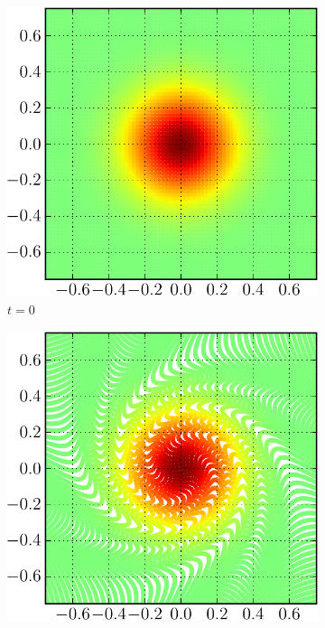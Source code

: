 \begin{figure}[t]
        \centering
        \begin{subfigure}[b]{0.45\textwidth}
                \includegraphics[width=\textwidth]{figures/lagrangian/distortion_a-crop.pdf}
                \caption{$t = 0$}
                \label{fig:distortion_a}
        \end{subfigure}%
        \qquad %
        \begin{subfigure}[b]{0.45\textwidth}
                \includegraphics[width=\textwidth]{figures/lagrangian/distortion_b-crop.pdf}

\end{subfigure}
\end{figure}
